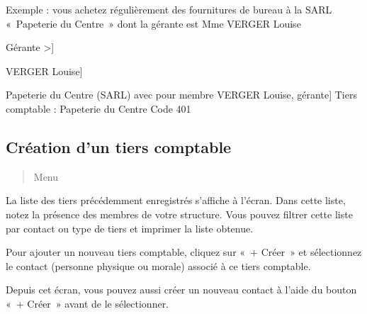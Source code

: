 \documentclass[a4paper,10pt,oneside,french]{sphinxmanual}
\begin{document}
\sphinxAtStartPar
Exemple : vous achetez régulièrement des fournitures de bureau à la SARL « Papeterie du Centre » dont la gérante est Mme VERGER Louise
\begin{description}
\begin{description}
\sphinxlineitem{Fonction}{[}Gérante                                  \textendash{}\textgreater{}{]}\begin{description}
\sphinxlineitem{Personne physique}{[}VERGER Louise{]}\begin{description}
\sphinxlineitem{Personne morale}{[}Papeterie du Centre (SARL) avec pour membre VERGER Louise, gérante{]}
\sphinxAtStartPar
Tiers comptable : Papeterie du Centre \sphinxhyphen{} Code 401

\end{description}

\end{description}

\end{description}

\end{description}


\subsection{Création d’un tiers comptable}
\label{\detokenize{accounting/third:creation-d-un-tiers-comptable}}\begin{quote}

\sphinxAtStartPar
Menu 
\end{quote}

\noindent{}

\sphinxAtStartPar
La liste des tiers précédemment enregistrés s’affiche à l’écran. Dans cette liste, notez la présence des membres de votre structure.
Vous pouvez filtrer cette liste par contact ou type de tiers et imprimer la liste obtenue.

\sphinxAtStartPar
Pour ajouter un nouveau tiers comptable, cliquez sur « + Créer » et sélectionnez le contact (personne physique ou morale) associé à ce tiers comptable.

\noindent{}

\sphinxAtStartPar
Depuis cet écran, vous pouvez aussi créer un nouveau contact à l’aide du bouton « + Créer » avant de le sélectionner.

\noindent{}
\end{document}
